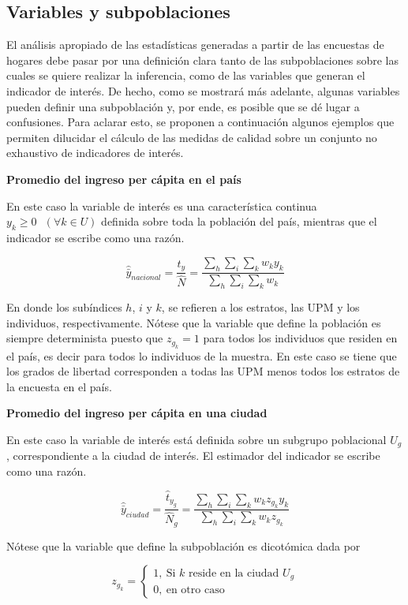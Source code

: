 \documentclass[
  12pt,
  spanish,
]{book}
\begin{document}
\hypertarget{variables-y-subpoblaciones}{%
\subsection{Variables y subpoblaciones}\label{variables-y-subpoblaciones}}

El análisis apropiado de las estadísticas generadas a partir de las encuestas de hogares debe pasar por una definición clara tanto de las subpoblaciones sobre las cuales se quiere realizar la inferencia, como de las variables que generan el indicador de interés. De hecho, como se mostrará más adelante, algunas variables pueden definir una subpoblación y, por ende, es posible que se dé lugar a confusiones. Para aclarar esto, se proponen a continuación algunos ejemplos que permiten dilucidar el cálculo de las medidas de calidad sobre un conjunto no exhaustivo de indicadores de interés.

\textbf{Promedio del ingreso per cápita en el país}

En este caso la variable de interés es una característica continua \(y_k \geq 0 \ \ \ (\forall k \in U)\) definida sobre toda la población del país, mientras que el indicador se escribe como una razón.

\[
\hat {\bar y}_{nacional} = \frac{\hat t_y}{\hat N} =\frac{\sum_h\sum_i\sum_k w_ky_{k}}{\sum_h\sum_i\sum_k w_k}
\]

En donde los subíndices \(h\), \(i\) y \(k\), se refieren a los estratos, las UPM y los individuos, respectivamente. Nótese que la variable que define la población es siempre determinista puesto que \(z_{g_k} = 1\) para todos los individuos que residen en el país, es decir para todos lo individuos de la muestra. En este caso se tiene que los grados de libertad corresponden a todas las UPM menos todos los estratos de la encuesta en el país.

\textbf{Promedio del ingreso per cápita en una ciudad}

En este caso la variable de interés está definida sobre un subgrupo poblacional \(U_g\), correspondiente a la ciudad de interés. El estimador del indicador se escribe como una razón.

\[
\hat {\bar y}_{ciudad}= \frac{\hat t_{y_g}}{\hat N_g} =\frac{\sum_h\sum_i\sum_k w_kz_{g_k}y_{k}}{\sum_h\sum_i\sum_k w_kz_{g_k}}
\]

Nótese que la variable que define la subpoblación es dicotómica dada por

\[ 
z_{g_k}=
\begin{cases}
1, \ \text{Si $k$ reside en la ciudad $U_g$} \\
0, \ \text{en otro caso}
\end{cases}
\]
\end{document}
